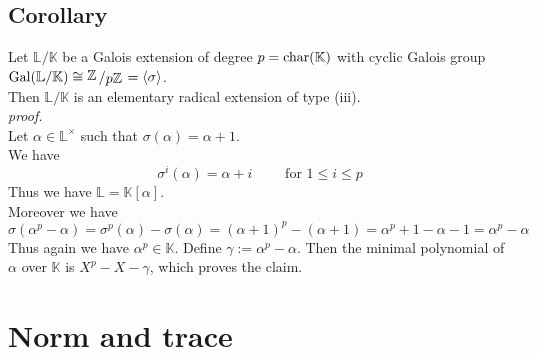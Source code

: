\documentclass[12pt]{book}
\newcommand{\slant}[2]{{\raisebox{.1em}{$#1$}\left/\raisebox{-.1em}{$#2$}\right.}}
\begin{document}
\begin{spacing}{1.3}
\subsection{Corollary} %
Let $\mathbb{L}/\mathbb{K}$ be a Galois extension of degree $p=\rm{char}(\mathbb{K})$ with cyclic Galois group $\rm{Gal}(\mathbb{L}/\mathbb{K}) \cong \slant{\mathbb{Z}}{p \mathbb{Z}}=\langle \sigma \rangle$.\\ Then $\mathbb{L}/\mathbb{K}$ is an elementary radical extension of type (iii).\\
\textit{proof.}\\
Let $\alpha \in \mathbb{L}^{\times}$ such that $\sigma(\alpha)=\alpha+1$.\\
We have $$\sigma^{i}(\alpha)=\alpha+i \qquad \textrm{ for }1 \leqslant i \leqslant p$$ Thus we have $\mathbb{L}=\mathbb{K}[\alpha]$.\\
Moreover we have
$$\sigma(\alpha^p-\alpha)=\sigma^p(\alpha)-\sigma(\alpha)=\left(\alpha+1\right)^p-(\alpha+1)=\alpha^p+1-\alpha-1=\alpha^p-\alpha$$
Thus again we have $\alpha^p \in \mathbb{K}$. Define $\gamma:= \alpha^p-\alpha$. Then the minimal polynomial of $\alpha$ over $\mathbb{K}$ is $X^p-X-\gamma$, which proves the claim.


\renewcommand*\thesection{§ \arabic{section}\quad}
\section{Norm and trace}
\renewcommand*\thesection{\arabic{section}}


\end{spacing}
\end{document}
